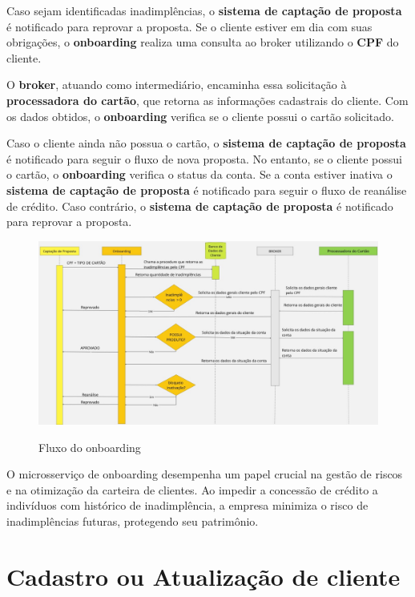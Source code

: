 Caso sejam identificadas inadimplências, o \textbf{sistema de captação de proposta} é notificado para reprovar a proposta.
Se o cliente estiver em dia com suas obrigações, o \textbf{onboarding} realiza uma consulta ao broker utilizando o \textbf{CPF} do cliente. 

O \textbf{broker}, atuando como intermediário, encaminha essa solicitação à \textbf{processadora do cartão},
que retorna as informações cadastrais do cliente. Com os dados obtidos, o \textbf{onboarding} verifica se o cliente possui o cartão solicitado.

Caso o cliente ainda não possua o cartão, o \textbf{sistema de captação de proposta} é notificado para seguir o 
fluxo de nova proposta. No entanto, se o cliente possui o cartão, 
o \textbf{onboarding} verifica o status da conta. Se a conta estiver inativa o 
\textbf{sistema de captação de proposta} é notificado para seguir o fluxo de reanálise de crédito. 
Caso contrário, o \textbf{sistema de captação de proposta} é notificado para reprovar a proposta.

\begin{figure}
    \centering
    \caption{Fluxo do onboarding}
    \includegraphics[width=1\textwidth]{arquivos/imagens/onboarding-fluxo.jpg}
    \label{fluxo-onboarding}
\end{figure}

O microsserviço de onboarding desempenha um papel crucial na gestão de riscos e na otimização da carteira de clientes. 
Ao impedir a concessão de crédito a indivíduos com histórico de inadimplência, a empresa minimiza o risco de 
inadimplências futuras, protegendo seu patrimônio.

\section{Cadastro ou Atualização de cliente}

